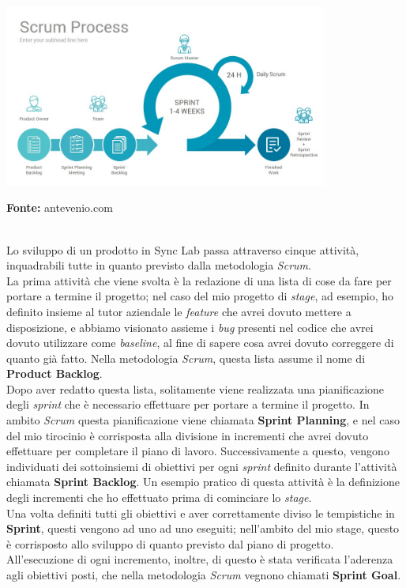 \begin{minipage}{\linewidth}
  \centering
    \includegraphics[height=6cm]{immagini/scrum}
  \caption*{\textbf{Fonte:} antevenio.com}
\end{minipage} \\

Lo sviluppo di un prodotto in Sync Lab passa attraverso cinque attività, inquadrabili tutte in quanto previsto dalla metodologia \textit{Scrum}. \\
La prima attività che viene svolta è la redazione di una lista di cose da fare per portare a termine il progetto; nel caso del mio progetto di \textit{stage}, ad esempio, ho definito insieme al tutor aziendale le \textit{feature} che avrei dovuto mettere a disposizione, e abbiamo visionato assieme i \textit{bug} presenti nel codice che avrei dovuto utilizzare come \textit{baseline}, al fine di sapere cosa avrei dovuto correggere di quanto già fatto. Nella metodologia \textit{Scrum}, questa lista assume il nome di \textbf{Product Backlog}. \\
Dopo aver redatto questa lista, solitamente viene realizzata una pianificazione degli \textit{sprint} che è necessario effettuare per portare a termine il progetto. In ambito \textit{Scrum} questa pianificazione viene chiamata \textbf{Sprint Planning}, e nel caso del mio tirocinio è corrisposta alla divisione in incrementi che avrei dovuto effettuare per completare il piano di lavoro. Successivamente a questo, vengono individuati dei sottoinsiemi di obiettivi per ogni \textit{sprint} definito durante l'attività chiamata \textbf{Sprint Backlog}. Un esempio pratico di questa attività è la definizione degli incrementi che ho effettuato prima di cominciare lo \textit{stage}. \\
Una volta definiti tutti gli obiettivi e aver correttamente diviso le tempistiche in \textbf{Sprint}, questi vengono ad uno ad uno eseguiti; nell'ambito del mio stage, questo è corrisposto allo sviluppo di quanto previsto dal piano di progetto. All'esecuzione di ogni incremento, inoltre, di questo è stata verificata l'aderenza agli obiettivi posti, che nella metodologia \textit{Scrum} vegnono chiamati \textbf{Sprint Goal}.

